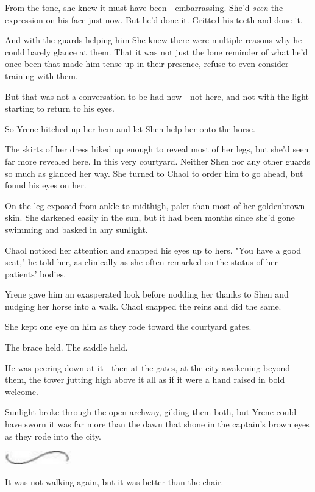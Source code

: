 From the tone, she knew it must have been---embarrassing. She'd
\emph{seen} the expression on his face just now. But he'd done it. Gritted his teeth and done it.

And with the guards helping him  She knew there were multiple reasons why he could barely glance at them. That it was not just the lone reminder of what he'd once been that made him tense up in their presence, refuse to even consider training with them.

But that was not a conversation to be had now---not here, and not with the light starting to return to his eyes.

So Yrene hitched up her hem and let Shen help her onto the horse.

The skirts of her dress hiked up enough to reveal most of her legs, but she'd seen far more revealed here. In this very courtyard. Neither Shen nor any other guards so much as glanced her way. She turned to Chaol to order him to go ahead, but found his eyes on her.

On the leg exposed from ankle to midthigh, paler than most of her goldenbrown skin. She darkened easily in the sun, but it had been months since she'd gone swimming and basked in any sunlight.

Chaol noticed her attention and snapped his eyes up to hers. "You have a good seat," he told her, as clinically as she often remarked on the status of her patients' bodies.

Yrene gave him an exasperated look before nodding her thanks to Shen and nudging her horse into a walk. Chaol snapped the reins and did the same.

She kept one eye on him as they rode toward the courtyard gates.

The brace held. The saddle held.

He was peering down at it---then at the gates, at the city awakening beyond them, the tower jutting high above it all as if it were a hand raised in bold welcome.

Sunlight broke through the open archway, gilding them both, but Yrene could have sworn it was far more than the dawn that shone in the captain's brown eyes as they rode into the city.

\includegraphics[width=1.12in,height=0.24in]{images/seperator}

It was not walking again, but it was better than the chair.

